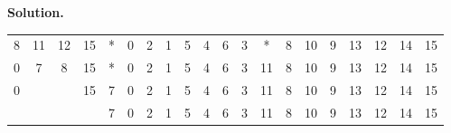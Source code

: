 \documentclass[12pt, a4paper]{article}
\newenvironment{sol}[1][Solution]
{\par\medskip\noindent \textbf{#1.} }
{\medskip}
\begin{document}
\begin{sol}
\begin{center}
\begin{tabular}{cccc|cccccccccccccccc}
				{8} & {\color{green}11} & {\color{red}12} & 15 &
				* & {\color{gray}0} & {\color{gray}2} & {\color{gray}1} & {\color{gray}5} & {\color{gray}4} & {\color{gray}6} & {\color{gray}3} & * & {\color{gray}8} & {\color{gray}10} & {\color{gray}9} & {\color{green}13} & {\color{gray}12} & {\color{gray}14} & {\color{gray}15} \\
				
				{0} & {\color{green}7} & {\color{red}8} & 15 &
				* & {\color{gray}0} & {\color{gray}2} & {\color{gray}1} & {\color{gray}5} & {\color{gray}4} & {\color{gray}6} & {\color{gray}3} & {\color{green}11} & {\color{gray}8} & {\color{gray}10} & {\color{gray}9} & {\color{gray}13} & {\color{gray}12} & {\color{gray}14} & {\color{gray}15} \\
				
				{\color{red}0} & {} & {} & 15 &
				{\color{green}7} & {\color{gray}0} & {\color{gray}2} & {\color{gray}1} & {\color{gray}5} & {\color{gray}4} & {\color{gray}6} & {\color{gray}3} & {\color{green}11} & {\color{gray}8} & {\color{gray}10} & {\color{gray}9} & {\color{gray}13} & {\color{gray}12} & {\color{gray}14} & {\color{gray}15} \\
				
				{} & {} & {} & {} &
				{\color{black}7} & {\color{black}0} & {\color{black}2} & {\color{black}1} & {\color{black}5} & {\color{black}4} & {\color{black}6} & {\color{black}3} & {\color{black}11} & {\color{black}8} & {\color{black}10} & {\color{black}9} & {\color{black}13} & {\color{black}12} & {\color{black}14} & {\color{black}15} \\
			\end{tabular}
		\end{center}
		

\end{sol}
\end{document}
